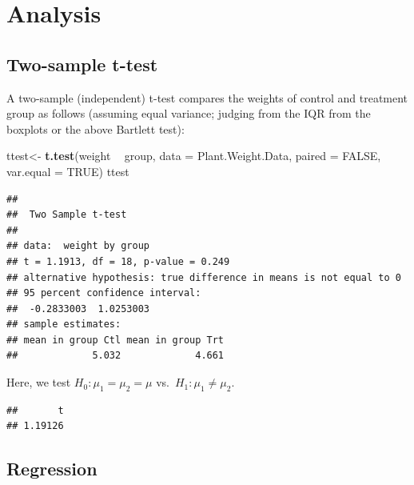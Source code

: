 \documentclass[
]{book}
\newenvironment{Shaded}{\begin{snugshade}}{\end{snugshade}}
\newcommand{\DataTypeTok}[1]{\textcolor[rgb]{0.13,0.29,0.53}{#1}}
\newcommand{\KeywordTok}[1]{\textcolor[rgb]{0.13,0.29,0.53}{\textbf{#1}}}
\newcommand{\NormalTok}[1]{#1}
\newcommand{\OperatorTok}[1]{\textcolor[rgb]{0.81,0.36,0.00}{\textbf{#1}}}
\newcommand{\OtherTok}[1]{\textcolor[rgb]{0.56,0.35,0.01}{#1}}
\newcommand{\StringTok}[1]{\textcolor[rgb]{0.31,0.60,0.02}{#1}}
\begin{document}
\hypertarget{analysis}{%
\section{Analysis}\label{analysis}}

\hypertarget{two-sample-t-test}{%
\subsection{Two-sample t-test}\label{two-sample-t-test}}

A two-sample (independent) t-test compares the weights of control and treatment group as follows (assuming equal variance; judging from the IQR from the boxplots or the above Bartlett test):

\begin{Shaded}
\begin{Highlighting}[]
\NormalTok{ttest<-}\StringTok{ }\KeywordTok{t.test}\NormalTok{(weight }\OperatorTok{~}\StringTok{ }\NormalTok{group, }\DataTypeTok{data =}\NormalTok{ Plant.Weight.Data, }
               \DataTypeTok{paired =} \OtherTok{FALSE}\NormalTok{, }\DataTypeTok{var.equal =} \OtherTok{TRUE}\NormalTok{)}
\NormalTok{ttest}
\end{Highlighting}
\end{Shaded}

\begin{verbatim}
## 
## 	Two Sample t-test
## 
## data:  weight by group
## t = 1.1913, df = 18, p-value = 0.249
## alternative hypothesis: true difference in means is not equal to 0
## 95 percent confidence interval:
##  -0.2833003  1.0253003
## sample estimates:
## mean in group Ctl mean in group Trt 
##             5.032             4.661
\end{verbatim}

Here, we test \(H_0 : \mu_1 = \mu_2 = \mu\) vs.~\(H_1 : \mu_1 \ne \mu_2\).

\begin{Shaded}
\end{Shaded}

\begin{verbatim}
##       t 
## 1.19126
\end{verbatim}

\hypertarget{regression}{%
\subsection{Regression}\label{regression}}
\end{document}
